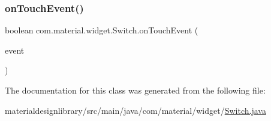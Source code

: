 \subsubsection{\texorpdfstring{on\+Touch\+Event()}{onTouchEvent()}}
{\footnotesize\ttfamily boolean com.\+material.\+widget.\+Switch.\+on\+Touch\+Event (\begin{DoxyParamCaption}\item[{@Non\+Null Motion\+Event}]{event }\end{DoxyParamCaption})}



The documentation for this class was generated from the following file\+:\begin{DoxyCompactItemize}
\item 
materialdesignlibrary/src/main/java/com/material/widget/\hyperlink{_switch_8java}{Switch.\+java}\end{DoxyCompactItemize}

